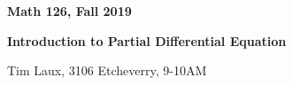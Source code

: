 \documentclass[12pt,letterpaper]{article}
\begin{document}
\thispagestyle{empty}
$ $
\vfill
\begin{center}

\centerline{\huge \textbf{Math 126, Fall 2019}}
\centerline{\Large \textbf{Introduction to Partial Differential Equation}} 
\centerline{ Tim Laux, 3106 Etcheverry, 9-10AM}
\end{center}
\vfill
$ $
\newpage
\thispagestyle{empty}
\tableofcontents
\newpage
\setcounter{page}{1}


\end{document}

